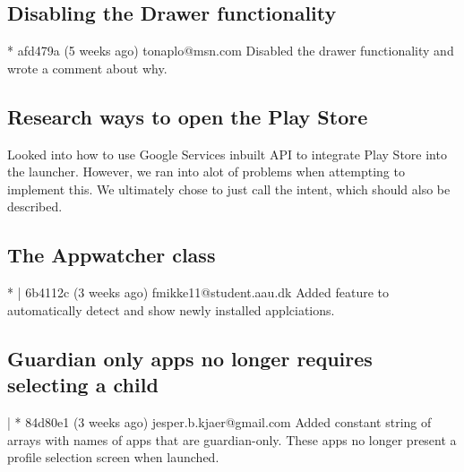 \subsection{Disabling the Drawer functionality}
* afd479a (5 weeks ago) tonaplo@msn.com Disabled the drawer functionality and wrote a comment about why. \\

\subsection{Research ways to open the Play Store}

Looked into how to use Google Services inbuilt API to integrate Play Store into the launcher.
However, we ran into alot of problems when attempting to implement this.
We ultimately chose to just call the intent, which should also be described.

\subsection{The Appwatcher class}
* | 6b4112c (3 weeks ago) fmikke11@student.aau.dk Added feature to automatically detect and show newly installed applciations.\\

\subsection{Guardian only apps no longer requires selecting a child}
| * 84d80e1 (3 weeks ago) jesper.b.kjaer@gmail.com Added constant string of arrays with names of apps that are guardian-only. These apps no longer present a profile selection screen when launched.\\